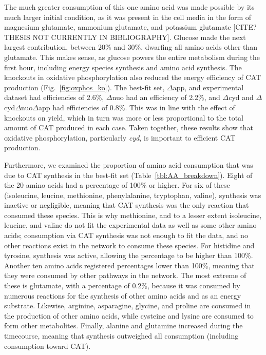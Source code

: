\documentclass[12pt]{article}
\begin{document}
The much greater consumption of this one amino acid was made possible by its much larger initial condition, as it was present in the cell media in the form of magnesium glutamate, ammonium glutamate, and potassium glutamate [CITE? THESIS NOT CURRENTLY IN BIBLIOGRAPHY].
Glucose made the next largest contribution, between 20\% and 30\%, dwarfing all amino acids other than glutamate.
This makes sense, as glucose powers the entire metabolism during the first hour, including energy species synthesis and amino acid synthesis.
The knockouts in oxidative phosphorylation also reduced the energy efficiency of CAT production  (Fig.~\ref{fig:oxphos_ko}).
The best-fit set, $\Delta$app, and experimental dataset had efficiencies of 2.6\%, $\Delta$nuo had an efficiency of 2.2\%, and $\Delta$cyd and $\Delta$cyd$\Delta$nuo$\Delta$app had efficiencies of 0.8\%.
This was in line with the effect of knockouts on yield, which in turn was more or less proportional to the total amount of CAT produced in each case.
Taken together, these results show that oxidative phosphorylation, particularly \textit{cyd}, is important to efficient CAT production.

Furthermore, we examined the proportion of amino acid consumption that was due to CAT synthesis in the best-fit set (Table~\ref{tbl:AA_breakdown}).
Eight of the 20 amino acids had a percentage of 100\% or higher.
For six of these (isoleucine, leucine, methionine, phenylalanine, tryptophan, valine), synthesis was inactive or negligible, meaning that CAT synthesis was the only reaction that consumed these species.
This is why methionine, and to a lesser extent isoleucine, leucine, and valine do not fit the experimental data as well as some other amino acids; consumption via CAT synthesis was not enough to fit the data, and no other reactions exist in the network to consume these species.
For histidine and tyrosine, synthesis was active, allowing the percentage to be higher than 100\%.
Another ten amino acids registered percentages lower than 100\%, meaning that they were consumed by other pathways in the network.
The most extreme of these is glutamate, with a percentage of 0.2\%, because it was consumed by numerous reactions for the synthesis of other amino acids and as an energy substrate.
Likewise, arginine, asparagine, glycine, and proline are consumed in the production of other amino acids, while cysteine and lysine are consumed to form other metabolites.
Finally, alanine and glutamine increased during the timecourse, meaning that synthesis outweighed all consumption (including consumption toward CAT).
\end{document}
